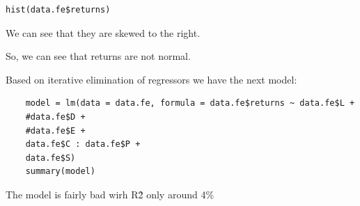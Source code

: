 \documentclass[12pt,a4paper]{article}
\begin{document}
\begin{verbatim}
hist(data.fe$returns)
\end{verbatim}
\begin{center}
\end{center}
We can see that they are skewed to the right.

So, we can see that returns are not normal.

Based on iterative elimination of regressors we have the next model:

\begin{verbatim}
	model = lm(data = data.fe, formula = data.fe$returns ~ data.fe$L +
	#data.fe$D +
	#data.fe$E +
	data.fe$C : data.fe$P +   
	data.fe$S)  
	summary(model)
\end{verbatim}
\begin{center}
\end{center}
The model is fairly bad wirh R\^2 only around 4\%
\end{document}
